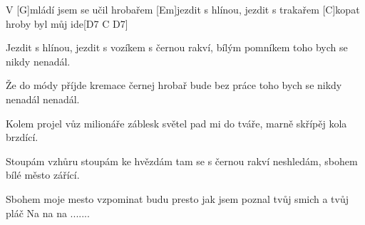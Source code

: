 
V [G]mládí jsem se učil hrobařem
[Em]jezdit s hlínou, jezdit s trakařem
[C]kopat hroby byl můj ide[D7 C D7] 

Jezdit s hlínou, jezdit s vozíkem
s černou rakví, bílým pomníkem
toho bych se nikdy nenadál.

Že do módy příjde kremace
černej hrobař bude bez práce
toho bych se nikdy nenadál nenadál.

Kolem projel vůz milionáře
záblesk světel pad mi do tváře,
marně skřípěj kola brzdící.

Stoupám vzhůru stoupám ke hvězdám
tam se s černou rakví neshledám,
sbohem bílé město zářící.

Sbohem moje mesto
vzpominat budu presto
jak jsem poznal tvůj smich a tvůj pláč Na na na .......

